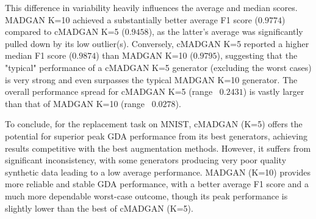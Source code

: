 This difference in variability heavily influences the average and median scores. MADGAN K=10 achieved a substantially better average F1 score ($0.9774$) compared to cMADGAN K=5 ($0.9458$), as the latter's average was significantly pulled down by its low outlier(s). Conversely, cMADGAN K=5 reported a higher median F1 score ($0.9874$) than MADGAN K=10 ($0.9795$), suggesting that the "typical" performance of a cMADGAN K=5 generator (excluding the worst cases) is very strong and even surpasses the typical MADGAN K=10 generator. The overall performance spread for cMADGAN K=5 (range ~$0.2431$) is vastly larger than that of MADGAN K=10 (range ~$0.0278$).

To conclude, for the replacement task on MNIST, cMADGAN (K=5) offers the potential for superior peak GDA performance from its best generators, achieving results competitive with the best augmentation methods. However, it suffers from significant inconsistency, with some generators producing very poor quality synthetic data leading to a low average performance. MADGAN (K=10) provides more reliable and stable GDA performance, with a better average F1 score and a much more dependable worst-case outcome, though its peak performance is slightly lower than the best of cMADGAN (K=5).


